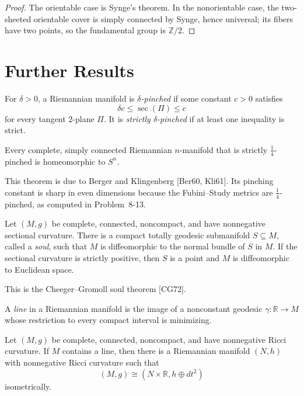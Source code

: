 \begin{proof}
\sketch
The orientable case is Synge's theorem.  In the nonorientable case, the
two-sheeted orientable cover is simply connected by Synge, hence universal;
its fibers have two points, so the fundamental group is $\mathbb Z/2$.
\end{proof}
\section{Further Results}

For $\delta>0$, a Riemannian manifold is \emph{$\delta$-pinched} if some
constant $c>0$ satisfies
\[
\delta c\leq\sec(\Pi)\leq c
\]
for every tangent $2$-plane $\Pi$. It is \emph{strictly
$\delta$-pinched} if at least one inequality is strict.

\begin{theorem}
\label{thm:sphere-theorem}

Every complete, simply connected Riemannian $n$-manifold that is strictly
$\frac14$-pinched is homeomorphic to $S^n$.
\end{theorem}

This theorem is due to Berger and Klingenberg [Ber60, Kli61]. Its pinching
constant is sharp in even dimensions because the Fubini--Study metrics are
$\frac14$-pinched, as computed in Problem~8-13.

\begin{theorem}
\label{thm:soul-theorem}

Let $(M,g)$ be complete, connected, noncompact, and have nonnegative
sectional curvature. There is a compact totally geodesic submanifold
$S\subseteq M$, called a \emph{soul}, such that $M$ is diffeomorphic to the
normal bundle of $S$ in $M$. If the sectional curvature is strictly positive,
then $S$ is a point and $M$ is diffeomorphic to Euclidean space.
\end{theorem}

This is the Cheeger--Gromoll soul theorem [CG72].

A \emph{line} in a Riemannian manifold is the image of a nonconstant geodesic
$\gamma:\mathbb R\to M$ whose restriction to every compact interval is
minimizing.

\begin{theorem}
\label{thm:splitting-theorem}

Let $(M,g)$ be complete, connected, noncompact, and have nonnegative Ricci
curvature. If $M$ contains a line, then there is a Riemannian manifold
$(N,h)$ with nonnegative Ricci curvature such that
\[
(M,g)\cong(N\times\mathbb R,h\oplus dt^2)
\]
isometrically.
\end{theorem}


